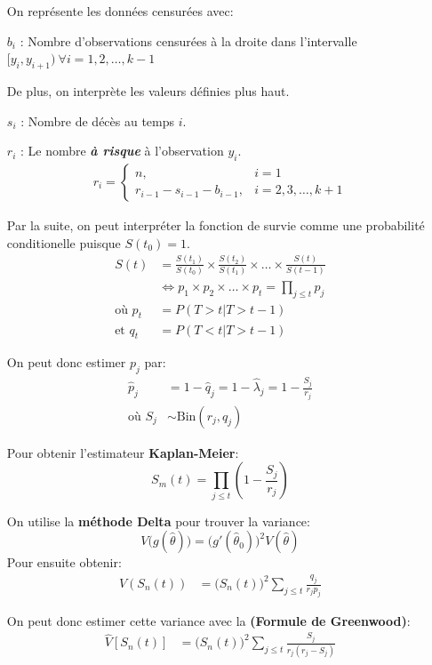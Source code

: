 \documentclass[french, landscape]{article}
\begin{document}
\begin{multicols*}{3}
\begin{enumerate}
	\item [] On représente les données censurées avec:
	\item[$b_{i}$ : ] Nombre d'observations censurées à la droite dans l'intervalle $[y_{i}, y_{i + 1}) \ \forall i = 1, 2, \dots, k - 1$
	\item[] De plus, on interprète les valeurs définies plus haut.
	\item[$s_i$ : ] Nombre de décès au temps $i$.
	\item[$r_i$ : ] Le nombre \textit{\textbf{à risque}} à l'observation $y_{i}$.
\begin{align*}
	r_{i} = 
		\begin{cases}
			n, & i = 1 \\
			r_{i - 1} - s_{i - 1} - b_{i - 1}, & i = 2, 3, \dots, k + 1
		\end{cases}
\end{align*}
\item[] Par la suite, on peut interpréter la fonction de survie comme une probabilité conditionelle puisque $S(t_0) = 1$.
\begin{align*}
	S(t) &= \frac{S(t_1)}{S(t_0)} \times \frac{S(t_2)}{S(t_1)} \times \dots \times \frac{S(t)}{S(t-1)} \\
	&\Leftrightarrow p_{1} \times p_{2} \times \dots \times p_{t} = \prod_{j \le t} p_{j} \\
	\text{où } p_{t} &= P(T > t | T > t - 1) \\
	\text{et } q_{t} &= P(T < t | T > t - 1)
\end{align*}
	\item[] On peut donc estimer $p_{j}$ par:
\begin{align*}
		\hat{p}_{j} &= 1 - \hat{q}_{j} = 1 - \hat{\lambda}_{j} = 1 - \frac{S_{j}}{r_{j}} \\
		\text{où } S_j &\sim \text{Bin}(r_j, q_j) 
\end{align*}
	\item[] Pour obtenir l'estimateur \textbf{Kaplan-Meier}:
	\[
	S_{m}(t) = \prod\limits_{j \le t} \left( 1 - \frac{S_j}{r_j} \right)
	\]		
	\item[] On utilise la \textbf{méthode Delta} pour trouver la variance:
	\[
		V\big(g(\widehat{\theta})\big) = \big(g'(\widehat{\theta}_{0})\big)^2 V(\widehat{\theta})
	\]
	Pour ensuite obtenir:
	\begin{align*}
		V(S_n(t)) &= \big( S_n(t) \big)^2 \sum_{j \le t}\frac{q_j}{r_j p_j} 
	\end{align*}
	\item[] On peut donc estimer cette variance avec la \textbf{(Formule de Greenwood)}:
	\begin{align*}	
		\widehat{V}[S_{n}(t)] &= \big(S_{n}(t)\big)^2 \sum_{j \le t} \frac{S_j}{r_j(r_j - S_j)} 
	\end{align*}
\end{enumerate}


\end{multicols*}
\end{document}
